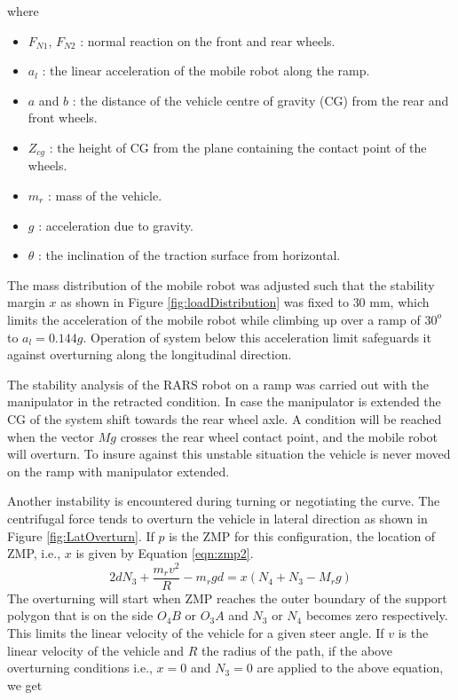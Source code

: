 where 
\begin{itemize}
\item[] $F_{N1}$, $F_{N2}$ :  normal reaction on the front and rear wheels.
\item [] $ a_l$ : the linear acceleration of the mobile robot along the ramp.
\item[] $a$ and $b$ :  the distance of the vehicle centre of gravity (CG) from the rear and front wheels.
\item [] $Z_{cg}$ :  the height of  CG from the  plane containing the contact point of the wheels.
\item [] $m_r$ : mass of the vehicle.
\item [] $g$ : acceleration due to gravity.
\item[] $\theta$ :  the inclination of the traction surface from horizontal.
\end{itemize}
The mass distribution of the mobile robot was  adjusted such that the stability margin $x$ as shown in Figure \ref{fig:loadDistribution} was fixed to $30$ mm, which  limits  the acceleration of the mobile robot while climbing up  over a ramp of $30^o$ to $ a_l=0.144g$. Operation of system below this acceleration limit safeguards it against overturning along the longitudinal direction. 

The stability analysis of the RARS robot on a ramp  was carried out with the manipulator in the retracted condition. In case the manipulator is extended  the CG of the system shift towards the rear wheel axle. A condition will be reached when the vector $Mg$ crosses the rear wheel contact point, and the mobile robot will overturn. To insure against this unstable situation the vehicle is never moved on the ramp with manipulator extended.
   
Another instability is encountered during turning or negotiating the curve. The centrifugal force tends to overturn the vehicle in lateral direction as shown in Figure \ref{fig:LatOverturn}.
If $p$ is the ZMP for this configuration, the location of ZMP, i.e., $x$ is given by Equation \ref{eqn:zmp2}. 
\begin{equation}
\label{eqn:zmp2}
2dN_3+ \frac{m_r v^2}{R}-m_r g d=x(N_4+N_3-M_r g)
\end{equation}
The overturning will start when ZMP reaches the outer boundary of the support polygon that is on the side $O_4B$ or $O_3A$ and $N_3$ or $N_4$ becomes zero respectively.
This limits the linear velocity of the vehicle for a given steer angle. If $v$ is the linear velocity of the vehicle and $R$ the radius of the path, if the above overturning conditions i.e., $x=0$ and $N_3=0$  are applied to the above equation, we get

